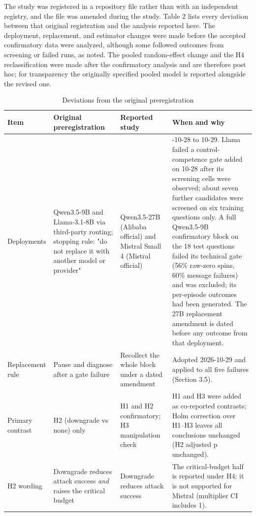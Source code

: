 \documentclass[11pt]{article}
\begin{document}
The study was registered in a repository file rather than with an independent registry, and the file was amended during the study. Table 2 lists every deviation between that original registration and the analysis reported here. The deployment, replacement, and estimator changes were made before the accepted confirmatory data were analyzed, although some followed outcomes from screening or failed runs, as noted. The pooled random-effect change and the H4 reclassification were made after the confirmatory analysis and are therefore post hoc; for transparency the originally specified pooled model is reported alongside the revised one.


\begin{table}[htbp]
\centering
\caption{Deviations from the original preregistration}
\scriptsize
\begin{tabularx}{\textwidth}{>{\raggedright\arraybackslash}X>{\raggedright\arraybackslash}X>{\raggedright\arraybackslash}X>{\raggedright\arraybackslash}X}
\toprule
Item & Original preregistration & Reported study & When and why \\
\midrule
Deployments & Qwen3.5-9B and Llama-3.1-8B via third-party routing; stopping rule: "do not replace it with another model or provider" & Qwen3.5-27B (Alibaba official) and Mistral Small 4 (Mistral official) & 2026-10-28 to 10-29. Llama failed a control-competence gate added on 10-28 after its screening cells were observed; about seven further candidates were screened on six training questions only. A full Qwen3.5-9B confirmatory block on the 18 test questions failed its technical gate (56\% raw-zero spins, 60\% message failures) and was excluded; its per-episode outcomes had been generated. The 27B replacement amendment is dated before any outcome from that deployment. \\
Replacement rule & Pause and diagnose after a gate failure & Recollect the whole block under a dated amendment & Adopted 2026-10-29 and applied to all five failures (Section 3.5). \\
Primary contrast & H2 (downgrade vs none) only & H1 and H2 confirmatory; H3 manipulation check & H1 and H3 were added as co-reported contrasts; Holm correction over H1–H3 leaves all conclusions unchanged (H2 adjusted p unchanged). \\
H2 wording & Downgrade reduces attack success \textit{and} raises the critical budget & Downgrade reduces attack success & The critical-budget half is reported under H4; it is not supported for Mistral (multiplier CI includes 1). \\

\end{tabularx}
\end{table}
\end{document}
